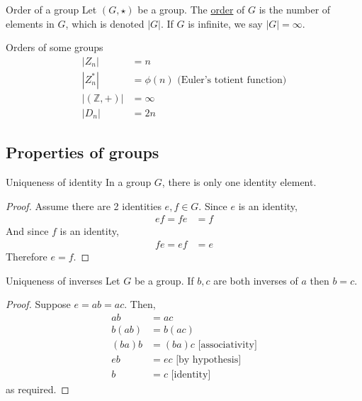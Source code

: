 \documentclass[12pt]{article}
\newcommand{\Z}{\mathbb{Z}}
\begin{document}
	\begin{mydef}{Order of a group}{}
		Let $(G, \star)$ be a group. The \underline{order} of $G$ is the number of elements in $G$, which is denoted $|G|$. If $G$ is infinite, we say $|G|=\infty$.	
	\end{mydef}
	
	\begin{myex}{Orders of some groups}{}
		\begin{align*}
			|Z_n|&=n\\
			|Z_n^*|&=\phi(n)\text{ (Euler's totient function)}\\
			|(\Z, +)|&=\infty\\
			|D_n|&=2n
		\end{align*}			
	\end{myex}
	
	\subsection{Properties of groups}
	\begin{myprop}{Uniqueness of identity}{}
		In a group $G$, there is only one identity element.
		\begin{proof}
			Assume there are 2 identities $e, f\in G$. Since $e$ is an identity,
			\begin{align*}
				ef=fe&=f
			\end{align*}
			And since $f$ is an identity,
			\begin{align*}
				fe=ef&=e
			\end{align*}
			Therefore $e=f$.
		\end{proof}			
	\end{myprop}
	
	\begin{myprop}{Uniqueness of inverses}{}
		Let $G$ be a group. If $b, c$ are both inverses of $a$ then $b=c$.
		\begin{proof}
			Suppose $e=ab=ac$. Then,\begin{align*}
				ab&=ac\\
				b(ab)&=b(ac)\\
				(ba)b&=(ba)c\text{ [associativity]}\\
				eb&=ec\text{ [by hypothesis]}\\
				b&=c\text{ [identity]}
			\end{align*}
			as required.
		\end{proof}	
	\end{myprop}
	
\end{document}
